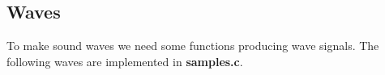 \subsection{Waves}

To make sound waves we need some functions producing wave signals. The following waves are implemented
in \textbf{samples.c}.

\begin{figure}[h]
\centering
\end{figure}
